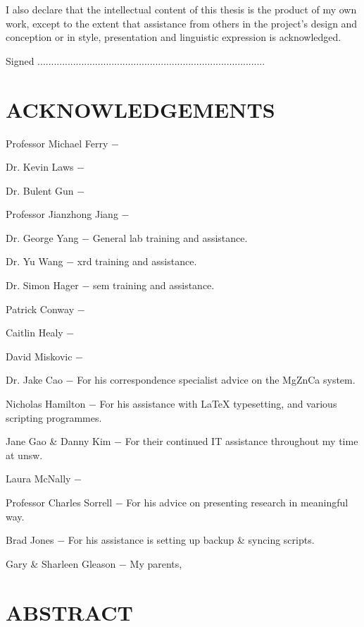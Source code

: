 \documentclass[a4paper,12pt,oneside]{report}%
\begin{document}
I also declare that the intellectual content of this thesis is the product of my own work,
except to the extent that assistance from others in the project’s design and conception
or in style, presentation and linguistic expression is acknowledged.

\vspace{2cm}

Signed ...................................................................................



\chapter*{ACKNOWLEDGEMENTS}

Professor Michael Ferry $-$ 

Dr. Kevin Laws $-$ 

Dr. Bulent Gun $-$ 

Professor Jianzhong Jiang $-$

Dr. George Yang $-$ General lab training and assistance.

Dr. Yu Wang $-$ \acrshort{xrd} training and assistance.

Dr. Simon Hager $-$ \acrshort{sem} training and assistance.

Patrick Conway $-$ 

Caitlin Healy $-$ 

David Miskovic $-$ 

Dr. Jake Cao $-$ For his correspondence specialist advice on the MgZnCa system.

Nicholas Hamilton $-$ For his assistance with \LaTeX{} typesetting, and various scripting programmes.

Jane Gao \& Danny Kim $-$ For their continued IT assistance throughout my time at \acrshort{unsw}.

Laura McNally $-$

Professor Charles Sorrell $-$ For his advice on presenting research in meaningful way.

Brad Jones $-$ For his assistance is setting up backup \& syncing scripts.

Gary \& Sharleen Gleason $-$ My parents, 


\chapter*{ABSTRACT}
\end{document}
